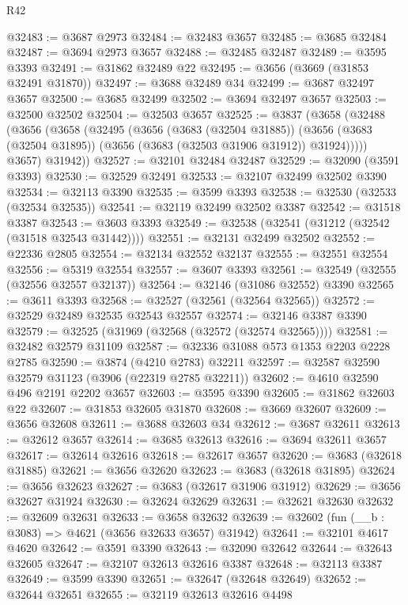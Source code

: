 \begin{lexlean}{R42}
\begin{coremodule}
@32483 := @3687 @2973
@32484 := @32483 @3657
@32485 := @3685 @32484
@32487 := @3694 @2973 @3657
@32488 := @32485 @32487
@32489 := @3595 @3393
@32491 := @31862 @32489 @22
@32495 := @3656 (@3669 (@31853 @32491 @31870))
@32497 := @3688 @32489 @34
@32499 := @3687 @32497 @3657
@32500 := @3685 @32499
@32502 := @3694 @32497 @3657
@32503 := @32500 @32502
@32504 := @32503 @3657
@32525 := @3837
    (@3658
      (@32488
        (@3656
          (@3658
            (@32495
              (@3656
                (@3683 (@32504 @31885))
                (@3656 (@3683 (@32504 @31895)) (@3656 (@3683 (@32503 @31906 @31912)) @31924)))))
          @3657)
        @31942))
@32527 := @32101 @32484 @32487
@32529 := @32090 (@3591 @3393)
@32530 := @32529 @32491
@32533 := @32107 @32499 @32502 @3390
@32534 := @32113 @3390
@32535 := @3599 @3393
@32538 := @32530 (@32533 (@32534 @32535))
@32541 := @32119 @32499 @32502 @3387
@32542 := @31518 @3387
@32543 := @3603 @3393
@32549 := @32538 (@32541 (@31212 (@32542 (@31518 @32543 @31442))))
@32551 := @32131 @32499 @32502
@32552 := @22336 @2805
@32554 := @32134 @32552 @32137
@32555 := @32551 @32554
@32556 := @5319 @32554
@32557 := @3607 @3393
@32561 := @32549 (@32555 (@32556 @32557 @32137))
@32564 := @32146 (@31086 @32552) @3390
@32565 := @3611 @3393
@32568 := @32527 (@32561 (@32564 @32565))
@32572 := @32529 @32489 @32535 @32543 @32557
@32574 := @32146 @3387 @3390
@32579 := @32525 (@31969 (@32568 (@32572 (@32574 @32565))))
@32581 := @32482 @32579 @31109
@32587 := @32336 @31088 @573 @1353 @2203 @2228 @2785
@32590 := @3874 (@4210 @2783) @32211
@32597 := @32587 @32590 @32579 @31123 (@3906 (@22319 @2785 @32211))
@32602 := @4610 @32590 @496 @2191 @2202 @3657
@32603 := @3595 @3390
@32605 := @31862 @32603 @22
@32607 := @31853 @32605 @31870
@32608 := @3669 @32607
@32609 := @3656 @32608
@32611 := @3688 @32603 @34
@32612 := @3687 @32611
@32613 := @32612 @3657
@32614 := @3685 @32613
@32616 := @3694 @32611 @3657
@32617 := @32614 @32616
@32618 := @32617 @3657
@32620 := @3683 (@32618 @31885)
@32621 := @3656 @32620
@32623 := @3683 (@32618 @31895)
@32624 := @3656 @32623
@32627 := @3683 (@32617 @31906 @31912)
@32629 := @3656 @32627 @31924
@32630 := @32624 @32629
@32631 := @32621 @32630
@32632 := @32609 @32631
@32633 := @3658 @32632
@32639 := @32602 (fun (__b : @3083) => @4621 (@3656 @32633 @3657) @31942)
@32641 := @32101 @4617 @4620
@32642 := @3591 @3390
@32643 := @32090 @32642
@32644 := @32643 @32605
@32647 := @32107 @32613 @32616 @3387
@32648 := @32113 @3387
@32649 := @3599 @3390
@32651 := @32647 (@32648 @32649)
@32652 := @32644 @32651
@32655 := @32119 @32613 @32616 @4498

\end{coremodule}
\end{lexlean}

